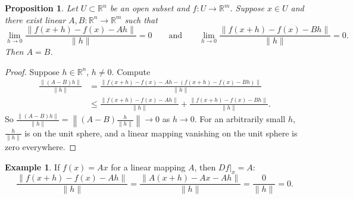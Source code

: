 \documentclass[12pt,openany]{book}
\newcommand{\snorm}[1]{\lVert {#1} \rVert}
\newcommand{\norm}[1]{\left\lVert {#1} \right\rVert}
\newcommand{\R}{{\mathbb{R}}}
\theoremstyle{plain}
\newtheorem{prop}[thm]{Proposition}
\theoremstyle{remark}
\theoremstyle{definition}
\theoremstyle{exercise}
\theoremstyle{example}
\newtheorem{example}[thm]{Example}
\begin{document}
\begin{prop}
Let $U \subset \R^n$ be an open subset and $f \colon U \to \R^m$.  Suppose
$x \in U$ and there exist linear
$A,B \colon \R^n \to \R^m$ such that
\begin{equation*}
\lim_{h \to 0}
\frac{\snorm{f(x+h)-f(x) - Ah}}{\snorm{h}} = 0
\qquad \text{and} \qquad
\lim_{h \to 0}
\frac{\snorm{f(x+h)-f(x) - Bh}}{\snorm{h}} = 0 .
\end{equation*}
Then $A=B$.
\end{prop}

\begin{proof}
Suppose $h \in \R^n$, $h \not= 0$.  Compute
\begin{equation*}
\begin{split}
\frac{\snorm{(A-B)h}}{\snorm{h}} & =
\frac{\snorm{f(x+h)-f(x) - Ah - (f(x+h)-f(x) - Bh)}}{\snorm{h}} \\
& \leq
\frac{\snorm{f(x+h)-f(x) - Ah}}{\snorm{h}} + \frac{\snorm{f(x+h)-f(x) -
Bh}}{\snorm{h}} .
\end{split}
\end{equation*}
So 
$\frac{\snorm{(A-B)h}}{\snorm{h}} = \norm{(A-B)\frac{h}{\snorm{h}}} \to 0$
as $h \to 0$.  For an arbitrarily small $h$, $\frac{h}{\snorm{h}}$ is
on the unit sphere, and a linear mapping vanishing on the unit sphere is
zero everywhere.
\end{proof}

\begin{example}
If $f(x) = Ax$ for a linear mapping $A$, then
$Df|_x = A$:
\begin{equation*}
\frac{\snorm{f(x+h)-f(x) - Ah}}{\snorm{h}}
=
\frac{\snorm{A(x+h)-Ax - Ah}}{\snorm{h}}
=
\frac{0}{\snorm{h}} = 0 .
\end{equation*}
\end{example}
\end{document}
